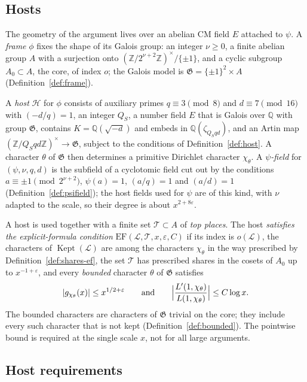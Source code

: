 \documentclass[11pt]{amsbook}
\theoremstyle{plain}
\theoremstyle{definition}
\theoremstyle{remark}
\numberwithin{equation}{section}
\numberwithin{figure}{chapter}
\numberwithin{table}{chapter}
\newcommand{\Q}{\mathbb{Q}}
\newcommand{\Z}{\mathbb{Z}}
\newcommand{\eps}{\varepsilon}
\newcommand{\lev}{\mathscr{L}}
\newcommand{\Kept}{\operatorname{Kept}}
\newcommand{\GG}{\mathfrak{G}}
\newcommand{\Top}{\mathcal{T}}
\begin{document}
\subsection*{Hosts}

The geometry of the argument lives over an abelian CM field $E$
attached to $\psi$. A \emph{frame} $\phi$ fixes the shape of its
Galois group: an integer $\nu\ge0$, a finite abelian group $A$ with
a surjection onto $(\Z/2^{\nu+2}\Z)^\times/\{\pm1\}$, and a cyclic
subgroup $A_0\subset A$, the core, of index $o$; the Galois model is
$\GG=\{\pm1\}^2\times A$ (Definition~\ref{def:frame}).

A \emph{host}
$\mathcal H$ for $\phi$ consists of auxiliary primes $q\equiv3
\pmod8$ and $d\equiv7\pmod{16}$ with $(-d/q)=1$, an integer $Q_S$,
a number field $E$ that is Galois over $\Q$ with group $\GG$,
contains $K=\Q(\sqrt{-d})$ and embeds in $\Q(\zeta_{Q_Sqd})$, and an
Artin map $(\Z/Q_Sqd\Z)^\times\to\GG$, subject to the conditions of
Definition~\ref{def:host}. A character $\theta$ of $\GG$ then
determines a primitive Dirichlet character $\chi_\theta$. A
\emph{$\psi$-field} for $(\psi,\nu,q,d)$ is the subfield of a
cyclotomic field cut out by the conditions
$a\equiv\pm1\pmod{2^{\nu+2}}$, $\psi(a)=1$, $(a/q)=1$ and $(a/d)=1$
(Definition~\ref{def:psifield}); the host fields used for $\psi$ are
of this kind, with $\nu$ adapted to the scale, so their degree is
about $x^{2+8\eps}$.

A host is used together with a finite set $\Top\subset A$ of
\emph{top places}. The host \emph{satisfies the explicit-formula
condition} $\mathrm{EF}(\lev,\Top,x,\eps,C)$ if its index is
$o(\lev)$, the characters of $\Kept(\lev)$ are among the characters
$\chi_\theta$ in the way prescribed by Definition~\ref{def:shares-ef},
the set $\Top$ has prescribed shares in the cosets of $A_0$ up to
$x^{-1+\eps}$, and every \emph{bounded} character $\theta$ of $\GG$
satisfies
\[
|g_{\chi_\theta}(x)|\le x^{1/2+\eps}\qquad\text{and}\qquad
\Bigl|\frac{L'(1,\chi_\theta)}{L(1,\chi_\theta)}\Bigr|\le C\log x.
\]
The bounded characters are characters of $\GG$ trivial on the core;
they include every such character that is not kept
(Definition~\ref{def:bounded}). The pointwise bound is required at
the single scale $x$, not for all large arguments.

\subsection*{Host requirements}
\end{document}
